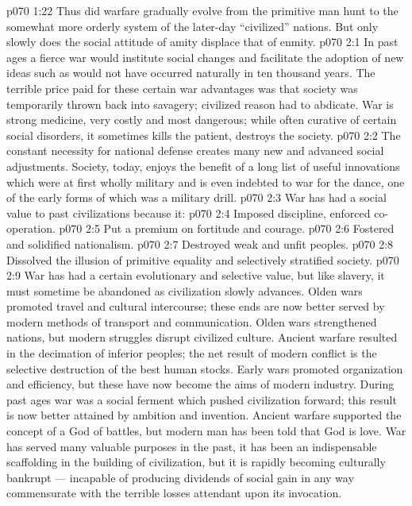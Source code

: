 \vs p070 1:22 Thus did warfare gradually evolve from the primitive man hunt to the somewhat more orderly system of the later\hyp{}day “civilized” nations. But only slowly does the social attitude of amity displace that of enmity.
\vs p070 2:1 In past ages a fierce war would institute social changes and facilitate the adoption of new ideas such as would not have occurred naturally in ten thousand years. The terrible price paid for these certain war advantages was that society was temporarily thrown back into savagery; civilized reason had to abdicate. War is strong medicine, very costly and most dangerous; while often curative of certain social disorders, it sometimes kills the patient, destroys the society.
\vs p070 2:2 The constant necessity for national defense creates many new and advanced social adjustments. Society, today, enjoys the benefit of a long list of useful innovations which were at first wholly military and is even indebted to war for the dance, one of the early forms of which was a military drill.
\vs p070 2:3 \pc War has had a social value to past civilizations because it:
\vs p070 2:4 \bibnobreakspace Imposed discipline, enforced co\hyp{}operation.
\vs p070 2:5 \bibnobreakspace Put a premium on fortitude and courage.
\vs p070 2:6 \bibnobreakspace Fostered and solidified nationalism.
\vs p070 2:7 \bibnobreakspace Destroyed weak and unfit peoples.
\vs p070 2:8 \bibnobreakspace Dissolved the illusion of primitive equality and selectively stratified society.
\vs p070 2:9 \pc War has had a certain evolutionary and selective value, but like slavery, it must sometime be abandoned as civilization slowly advances. Olden wars promoted travel and cultural intercourse; these ends are now better served by modern methods of transport and communication. Olden wars strengthened nations, but modern struggles disrupt civilized culture. Ancient warfare resulted in the decimation of inferior peoples; the net result of modern conflict is the selective destruction of the best human stocks. Early wars promoted organization and efficiency, but these have now become the aims of modern industry. During past ages war was a social ferment which pushed civilization forward; this result is now better attained by ambition and invention. Ancient warfare supported the concept of a God of battles, but modern man has been told that God is love. War has served many valuable purposes in the past, it has been an indispensable scaffolding in the building of civilization, but it is rapidly becoming culturally bankrupt --- incapable of producing dividends of social gain in any way commensurate with the terrible losses attendant upon its invocation.
